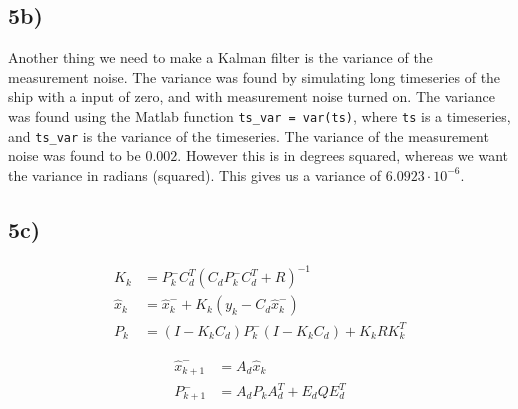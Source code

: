\subsection{5b)}

Another thing we need to make a Kalman filter is the variance of the measurement noise. The variance was found by simulating long timeseries of the ship with a input of zero, and with measurement noise turned on. The variance was found using the Matlab function \texttt{ts\_var = var(ts)}, where \texttt{ts} is a timeseries, and \texttt{ts\_var} is the variance of the timeseries. The variance of the measurement noise was found to be $0.002$. However this is in degrees squared, whereas we want the variance in radians (squared). This gives us a variance of $6.0923 \cdot 10^{-6}$.

\subsection{5c)}


\begin{subequations}
    \begin{align}
        K_k &= P_k^-C_d^T(C_dP_k^-C_d^T+R)^{-1} \\
        \hat{x}_k &= \hat{x}_k^- + K_k(y_k - C_d\hat{x}_k^-) \\
        P_k &= (I - K_kC_d)P_k^-(I-K_kC_d) + K_kRK_k^T
    \end{align}

\end{subequations}


\begin{subequations}
    \begin{align}
        \hat{x}_{k+1}^- &= A_d\hat{x}_k \\
        P_{k+1}^- &= A_d P_k A_d^T + E_d Q E_d^T
    \end{align}

\end{subequations}



